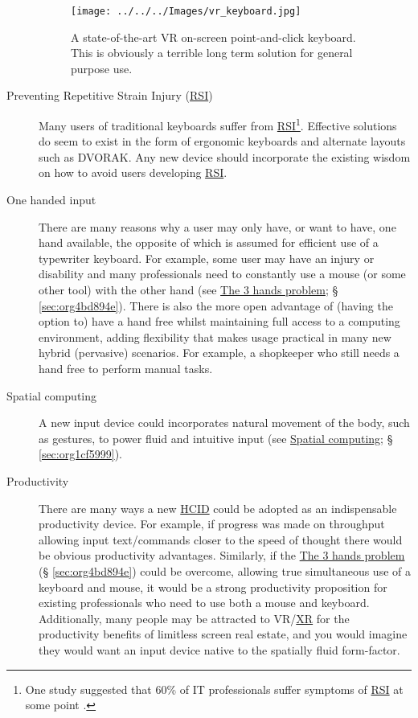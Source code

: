 \documentclass[logo,bsc,singlespacing,parskip]{infthesis}
\begin{document}
\begin{description}
\begin{figure}[h]
\centering
\texttt{[image: ../../../Images/vr\_keyboard.jpg]}
\caption[VR point-and-click on-screen keybaord]{\label{fig:virtual_keyboard}A state-of-the-art VR on-screen point-and-click keyboard. This is obviously a terrible long term solution for general purpose use.}
\end{figure}
\item[{Preventing Repetitive Strain Injury (\hyperref[org77f0234]{RSI})}] Many users of traditional keyboards suffer from \hyperref[org77f0234]{RSI}\footnote{One study suggested that 60\% of IT professionals suffer symptoms of \hyperref[org77f0234]{RSI} at some point \autocite{namayandegiEVALUATIONMETHODWHICH2015}.}.
Effective solutions do seem to exist in the form of ergonomic keyboards and alternate layouts such as DVORAK.
Any new device should incorporate the existing wisdom on how to avoid users developing \hyperref[org77f0234]{RSI}.

\item[{One handed input}] There are many reasons why a user may only have, or want to have, one hand available, the opposite of which is assumed for efficient use of a typewriter keyboard.
For example, some user may have an injury or disability and many professionals need to constantly use a mouse (or some other tool) with the other hand (see \hyperref[sec:org4bd894e]{The 3 hands problem}; § \ref{sec:org4bd894e}).
There is also the more open advantage of (having the option to) have a hand free whilst maintaining full access to a computing environment, adding flexibility that makes usage practical in many new hybrid (pervasive) scenarios.
For example, a shopkeeper who still needs a hand free to perform manual tasks.

\item[{Spatial computing}] A new input device could incorporates natural movement of the body, such as gestures, to power fluid and intuitive input (see \hyperref[sec:org9801c9a]{Spatial computing}; § \ref{sec:org1cf5999}).

\item[{Productivity}] There are many ways a new \hyperref[org0c83164]{HCID} could be adopted as an indispensable productivity device.
For example, if progress was made on throughput allowing input text/commands closer to the speed of thought there would be obvious productivity advantages.
Similarly, if the \hyperref[sec:org4bd894e]{The 3 hands problem} (§ \ref{sec:org4bd894e}) could be overcome, allowing true simultaneous use of a keyboard and mouse, it would be a strong productivity proposition for existing professionals who need to use both a mouse and keyboard.
Additionally, many people may be attracted to VR/\hyperref[org39cbd51]{XR} for the productivity benefits of limitless screen real estate, and you would imagine they would want an input device native to the spatially fluid form-factor.
\end{description}
\end{document}
